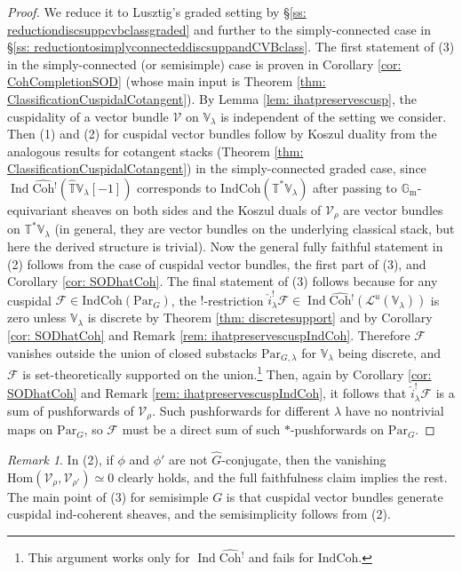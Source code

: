 \documentclass{amsart}
\theoremstyle{definition}
\theoremstyle{remark}
\newtheorem{remark}[theorem]{Remark}
\numberwithin{equation}{section}
\DeclareMathOperator{\Ind}{Ind}
\newcommand{\mc}{\mathcal}
\newcommand{\Gm}{{\mathbb{G}_{\mathrm{m}}}}
\newcommand{\Hom}{\mathrm{Hom}}
\newcommand{\wh}{\widehat}
\newcommand{\Par}{\mathrm{Par}}
\newcommand{\IndCoh}{\mathrm{IndCoh}}
\newcommand{\Coh}{\mathrm{Coh}}
\newcommand{\V}{\mathbb{V}}
\newcommand{\T}{\mathbb{T}}
\begin{document}
\begin{proof}
    We reduce it to Lusztig's graded setting by \S \ref{ss: reductiondiscsuppcvbclassgraded} and further to the simply-connected case in \S\ref{ss: reductiontosimplyconnecteddiscsuppandCVBclass}. 
    The first statement of (3) in the simply-connected (or semisimple) case is proven in Corollary \ref{cor: CohCompletionSOD} (whose main input is Theorem \ref{thm: ClassificationCuspidalCotangent}). 
    By Lemma \ref{lem: ihatpreservescusp}, the cuspidality of a vector bundle $\mc V$ on $\V_\lambda$ is independent of the setting we consider. 
    Then (1) and (2) for cuspidal vector bundles follow by Koszul duality from the analogous results for cotangent stacks (Theorem \ref{thm: ClassificationCuspidalCotangent}) in the simply-connected graded case, since $\Ind\wh{\Coh}{}^!(\wh{\T}\V_\lambda[-1]
    )$ corresponds to $\IndCoh(\T^*\V_\lambda)$ after passing to $\Gm$-equivariant sheaves on both sides and the Koszul duals of $\mc V_\rho$ are vector bundles on $\T^*\V_\lambda$ (in general, they are vector bundles on the underlying classical stack, but here the derived structure is trivial). Now the general fully faithful statement in (2) follows from the case of cuspidal vector bundles, the first part of (3), and Corollary \ref{cor: SODhatCoh}. The final statement of (3) follows because for any cuspidal $\mc{F} \in \IndCoh(\Par_G)$, the $!$-restriction $\wh{i}^!_{\lambda} \mc{F} \in \Ind\wh{\Coh}{}^!(\mc{L}^u(\V_\lambda))$ is zero unless $\V_\lambda$ is discrete by Theorem \ref{thm: discretesupport} and by Corollary \ref{cor: SODhatCoh} and Remark \ref{rem: ihatpreservescuspIndCoh}. Therefore $\mc F$ vanishes outside the union of closed substacks $\Par_{G,\lambda}$ for $\V_\lambda$ being discrete, and $\mc F$ is set-theoretically supported on the union.\footnote{This argument works only for $\Ind\wh{\Coh}{}^!$ and fails for $\IndCoh$.} Then, again by Corollary \ref{cor: SODhatCoh} and Remark \ref{rem: ihatpreservescuspIndCoh}, it follows that $\wh{i}^!_{\lambda} \mc{F}$ is a sum of pushforwards of $\mc{V}_{\rho}$. Such pushforwards for different $\lambda$ have no nontrivial maps on $\Par_G$, so $\mc F$ must be a direct sum of such $*$-pushforwards on $\Par_G$. 
\end{proof}

\begin{remark}
In (2), if $\phi$ and $\phi'$ are not $\wh G$-conjugate, then the vanishing $\Hom (\mathcal{V}_{\rho}, \mathcal{V}_{\rho'})\simeq 0$ clearly holds, and the full faithfulness claim implies the rest. The main point of (3) for semisimple $G$ is that cuspidal vector bundles generate cuspidal ind-coherent sheaves, and the semisimplicity follows from (2).  
\end{remark}
\end{document}
